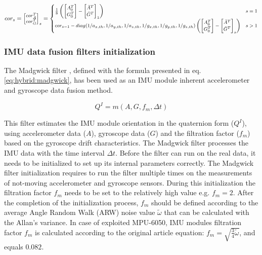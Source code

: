 \documentclass[sensors,article,submit,moreauthors,pdftex,10pt,a4paper]{mdpi}
\begin{document}
\begin{equation}
	\footnotesize
	cor_s = \begin{bmatrix}cor_A^T\\ cor_G^T\end{bmatrix}_s =
	\begin{cases}
		\frac{1}{8}\left(\begin{bmatrix}A_0^T                                                                          \\ G_0^T\end{bmatrix} - \begin{bmatrix}\bar{A}^T\\ \bar{G}^T\end{bmatrix}_1\right) & s = 1\\
		cor_{s-1} - diag(1/a_{x,th},1/a_{y,th},1/a_{z,th},1/g_{x,th},1/g_{y,th},1/g_{z,th}) \left(\begin{bmatrix}A_0^T \\ G_0^T\end{bmatrix} - \begin{bmatrix}\bar{A}^T\\ \bar{G}^T\end{bmatrix}_s\right) & s > 1
	\end{cases}
	\label{eq:hybrid:IMUCalibration:2}
\end{equation}	
		
\subsubsection{IMU data fusion filters initialization}
The Madgwick filter \cite{Madgwick2011}, defined with the formula presented in eq. \ref{eq:hybrid:madgwick}, has been used as an IMU module inherent accelerometer and gyroscope data fusion method. 
		
\begin{equation}
	Q^I=m(A,G,f_m,\Delta t)
	\label{eq:hybrid:madgwick}
\end{equation}
		
This filter estimates the IMU module orientation in the quaternion form ($Q^I$), using accelerometer data ($A$), gyroscope data ($G$) and the filtration factor ($f_m$) based on the gyroscope drift characteristics. The Madgwick filter processes the IMU data with the time interval $\Delta t$. Before the filter can run on the real data, it needs to be initialized to set up its internal parameters correctly. The Madgwick filter initialization requires to run the filter multiple times on the measurements of not-moving accelerometer and gyroscope sensors. During this initialization the filtration factor $f_m$ needs to be set to the relatively high value e.g. $f_m = 2$. After the completion of the initialization process, $f_m$ should be defined according to the average Angle Random Walk (ARW) noise value $\widetilde{\omega}$ that can be calculated with the Allan’s variance\cite{FreescaleSemiconductor2015,Allan1966,Allan1987}. In case of exploited MPU-6050, IMU modules filtration factor $f_m$ is calculated according to the original article \cite{Madgwick2011} equation: $f_m = \sqrt{\frac{3}{4}\widetilde{\omega}}$, and equals $0.082$. 
		
\end{document}
